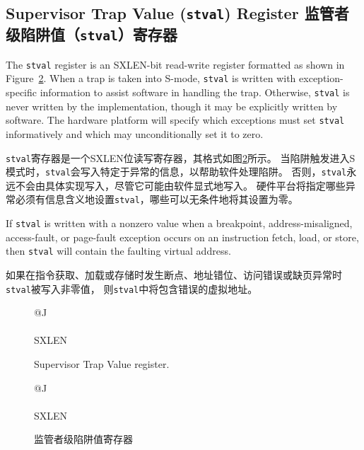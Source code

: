 \subsection{Supervisor Trap Value ({\tt stval}) Register 监管者级陷阱值（{\tt stval}）寄存器}

The {\tt stval} register is an SXLEN-bit read-write register formatted as shown
in Figure~\ref{stvalreg}.  When a trap is taken into S-mode, {\tt stval} is
written with exception-specific information to assist software in handling the
trap.  Otherwise, {\tt stval} is never written by the implementation, though
it may be explicitly written by software.  The hardware platform will specify
which exceptions must set {\tt stval} informatively and which may
unconditionally set it to zero.

{\tt stval}寄存器是一个SXLEN位读写寄存器，其格式如图\ref{stvalreg}所示。
当陷阱触发进入S模式时，{\tt stval}会写入特定于异常的信息，以帮助软件处理陷阱。
否则，{\tt stval}永远不会由具体实现写入，尽管它可能由软件显式地写入。
硬件平台将指定哪些异常必须有信息含义地设置{\tt stval}，哪些可以无条件地将其设置为零。

If {\tt stval} is written with a nonzero value when a breakpoint,
address-misaligned, access-fault, or page-fault exception occurs on an
instruction fetch, load, or store, then {\tt stval} will contain the faulting
virtual address.

如果在指令获取、加载或存储时发生断点、地址错位、访问错误或缺页异常时{\tt stval}被写入非零值，
则{\tt stval}中将包含错误的虚拟地址。

\begin{figure}[h!]
{\footnotesize
\begin{center}
\begin{tabular}{@{}J}
 \\
\hline
{} \\
\hline
SXLEN \\
\end{tabular}
\end{center}
}
\vspace{-0.1in}
\caption{Supervisor Trap Value register.}
\label{stvalreg}
\end{figure}

\begin{figure}[h!]
{\footnotesize
\begin{center}
\begin{tabular}{@{}J}
 \\
\hline
{} \\
\hline
SXLEN \\
\end{tabular}
\end{center}
}
\vspace{-0.1in}
\caption{监管者级陷阱值寄存器}
\label{stvalreg}
\end{figure}

